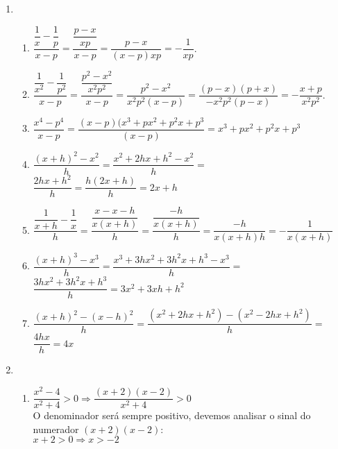 \begin{enumerate}
\begin{enumerate}
		\end{enumerate}
		\item %
		\begin{enumerate}
			\addtocounter{enumii}{7}
			\item %
			$\dfrac{\dfrac{1}{x}-\dfrac{1}{p}}{x - p} = \dfrac{\dfrac{p - x}{xp}}{x - p} = \dfrac{p - x}{(x - p)xp} = -\dfrac{1}{xp}$.\\
			\item %
			$\dfrac{\dfrac{1}{x^2}-\dfrac{1}{p^2}}{x-p} = \dfrac{\dfrac{p^2-x^2}{x^2p^2}}{x-p} = \dfrac{p^2-x^2}{x^2p^2(x-p)} = \dfrac{(p-x)(p+x)}{-x^2p^2(p-x)} = -\dfrac{x+p}{x^2p^2}$.\\
			\addtocounter{enumii}{1}
			\item %
			$\dfrac{x^4-p^4}{x-p} = \dfrac{(x-p)(x^3+px^2+p^2x+p^3}{(x-p)} = x^3+px^2+p^2x+p^3$\\
			\item %
			$\dfrac{(x+h)^2-x^2}{h} = \dfrac{x^2+2hx+h^2-x^2}{h} =$\\
			$ \dfrac{2hx + h^2}{h} = \dfrac{h(2x + h)}{h} = 2x + h$\\
			\item %
			$\dfrac{\dfrac{1}{x+h}-\dfrac{1}{x}}{h} = \dfrac{\dfrac{x-x-h}{x(x+h)}}{h} = \dfrac{\dfrac{-h}{x(x+h)}}{h}=\dfrac{-h}{x(x+h)h} = -\dfrac{1}{x(x+h)}$\\
			\item %
			$\dfrac{(x+h)^3-x^3}{h} = \dfrac{x^3+3hx^2+3h^2x+h^3-x^3}{h} =$\\ 						$\dfrac{3hx^2+3h^2x+h^3}{h} = 3x^2+3xh+h^2$\\
			\item %
			$\dfrac{(x+h)^2-(x-h)^2}{h} = \dfrac{(x^2+2hx+h^2)-(x^2-2hx+h^2)}{h} =$\\ 
			$\dfrac{4hx}{h} = 4x$\\
		\end{enumerate}
		\item %
		\begin{enumerate}
			\addtocounter{enumii}{5}
			\item %
			$\dfrac{x^2 - 4}{x^2 + 4} > 0 \Rightarrow \dfrac{(x + 2)(x - 2)}{x^2 + 4} > 0$\\
			O denominador será sempre positivo, devemos analisar o sinal do numerador $(x + 2)(x - 2)$:\\
			$x + 2 > 0 \Rightarrow x > -2$\\

\end{enumerate}
\end{enumerate}
